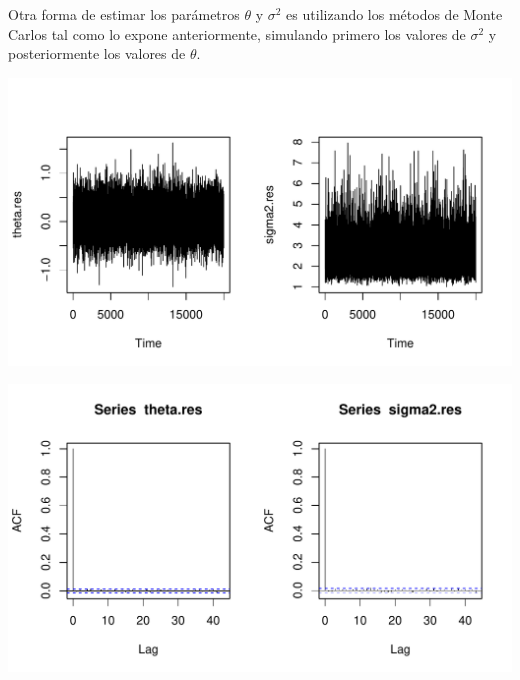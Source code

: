\begin{Eje}
Otra forma de estimar los parámetros $\theta$ y $\sigma^2$ es utilizando los métodos de Monte Carlos tal como lo expone anteriormente, simulando primero los valores de $\sigma^2$ y posteriormente los valores de $\theta$.
\begin{knitrout}
\color{fgcolor}\begin{kframe}
\begin{alltt}
\hlstd{(}\hlstd{)}
 \hlkwb{<-} 
 \hlkwb{<-} \hlopt{+}\hlopt{/}\hlopt{+}\hlopt{*}\hlopt{/}\hlstd{)}
 \hlkwb{<-} \hlstd{()}
  \hlopt{:}
   \hlkwb{<-} \hlstd{(} \hlopt{/}\hlopt{+}
\hlstd{\}}
\hlstd{(}\hlstd{=}\hlstd{(}\hlstd{,}\hlstd{))}
\end{alltt}
\end{kframe}
\includegraphics[width=\maxwidth]{figure/unnamed-chunk-7-1} 
\begin{kframe}\begin{alltt}
\end{alltt}
\end{kframe}
\includegraphics[width=\maxwidth]{figure/unnamed-chunk-7-2} 

\end{knitrout}
\end{Eje}
